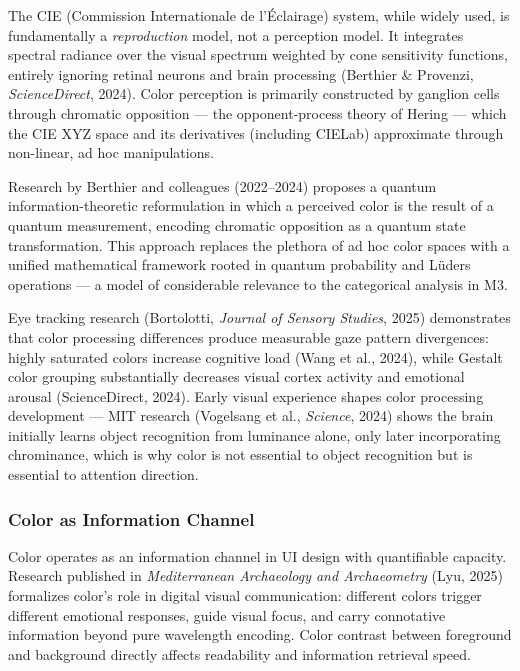 \documentclass[11pt,letterpaper]{article}
\begin{document}
The CIE (Commission Internationale de l'Éclairage) system, while widely used, is fundamentally a \textit{reproduction} model, not a perception model. It integrates spectral radiance over the visual spectrum weighted by cone sensitivity functions, entirely ignoring retinal neurons and brain processing (Berthier \& Provenzi, \textit{ScienceDirect}, 2024). Color perception is primarily constructed by ganglion cells through chromatic opposition --- the opponent-process theory of Hering --- which the CIE XYZ space and its derivatives (including CIELab) approximate through non-linear, ad hoc manipulations.

Research by Berthier and colleagues (2022--2024) proposes a quantum information-theoretic reformulation in which a perceived color is the result of a quantum measurement, encoding chromatic opposition as a quantum state transformation. This approach replaces the plethora of ad hoc color spaces with a unified mathematical framework rooted in quantum probability and Lüders operations --- a model of considerable relevance to the categorical analysis in M3.

Eye tracking research (Bortolotti, \textit{Journal of Sensory Studies}, 2025) demonstrates that color processing differences produce measurable gaze pattern divergences: highly saturated colors increase cognitive load (Wang et al., 2024), while Gestalt color grouping substantially decreases visual cortex activity and emotional arousal (ScienceDirect, 2024). Early visual experience shapes color processing development --- MIT research (Vogelsang et al., \textit{Science}, 2024) shows the brain initially learns object recognition from luminance alone, only later incorporating chrominance, which is why color is not essential to object recognition but is essential to attention direction.

\subsubsection{Color as Information Channel}

Color operates as an information channel in UI design with quantifiable capacity. Research published in \textit{Mediterranean Archaeology and Archaeometry} (Lyu, 2025) formalizes color's role in digital visual communication: different colors trigger different emotional responses, guide visual focus, and carry connotative information beyond pure wavelength encoding. Color contrast between foreground and background directly affects readability and information retrieval speed.
\end{document}
